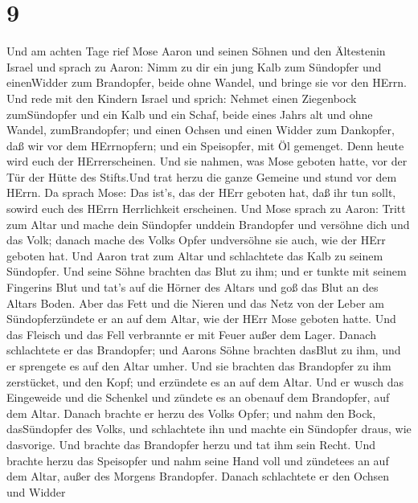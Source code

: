 \hypertarget{section-8}{%
\section{9}\label{section-8}}

 Und am achten Tage rief Mose Aaron und seinen Söhnen und
den Ältestenin Israel  und sprach zu Aaron: Nimm zu dir ein
jung Kalb zum Sündopfer und einenWidder zum Brandopfer, beide ohne
Wandel, und bringe sie vor den HErrn.  Und rede mit den
Kindern Israel und sprich: Nehmet einen Ziegenbock zumSündopfer und ein
Kalb und ein Schaf, beide eines Jahrs alt und ohne Wandel,
zumBrandopfer;  und einen Ochsen und einen Widder zum
Dankopfer, daß wir vor dem HErrnopfern; und ein Speisopfer, mit Öl
gemenget. Denn heute wird euch der HErrerscheinen.  Und sie
nahmen, was Mose geboten hatte, vor der Tür der Hütte des Stifts.Und
trat herzu die ganze Gemeine und stund vor dem HErrn.  Da
sprach Mose: Das ist's, das der HErr geboten hat, daß ihr tun sollt,
sowird euch des HErrn Herrlichkeit erscheinen.  Und Mose
sprach zu Aaron: Tritt zum Altar und mache dein Sündopfer unddein
Brandopfer und versöhne dich und das Volk; danach mache des Volks Opfer
undversöhne sie auch, wie der HErr geboten hat.  Und Aaron
trat zum Altar und schlachtete das Kalb zu seinem Sündopfer.
 Und seine Söhne brachten das Blut zu ihm; und er tunkte mit
seinem Fingerins Blut und tat's auf die Hörner des Altars und goß das
Blut an des Altars Boden.  Aber das Fett und die Nieren und
das Netz von der Leber am Sündopferzündete er an auf dem Altar, wie der
HErr Mose geboten hatte.  Und das Fleisch und das Fell
verbrannte er mit Feuer außer dem Lager.  Danach
schlachtete er das Brandopfer; und Aarons Söhne brachten dasBlut zu ihm,
und er sprengete es auf den Altar umher.  Und sie brachten
das Brandopfer zu ihm zerstücket, und den Kopf; und erzündete es an auf
dem Altar.  Und er wusch das Eingeweide und die Schenkel
und zündete es an obenauf dem Brandopfer, auf dem Altar. 
Danach brachte er herzu des Volks Opfer; und nahm den Bock, dasSündopfer
des Volks, und schlachtete ihn und machte ein Sündopfer draus, wie
dasvorige.  Und brachte das Brandopfer herzu und tat ihm
sein Recht.  Und brachte herzu das Speisopfer und nahm
seine Hand voll und zündetees an auf dem Altar, außer des Morgens
Brandopfer.  Danach schlachtete er den Ochsen und Widder
